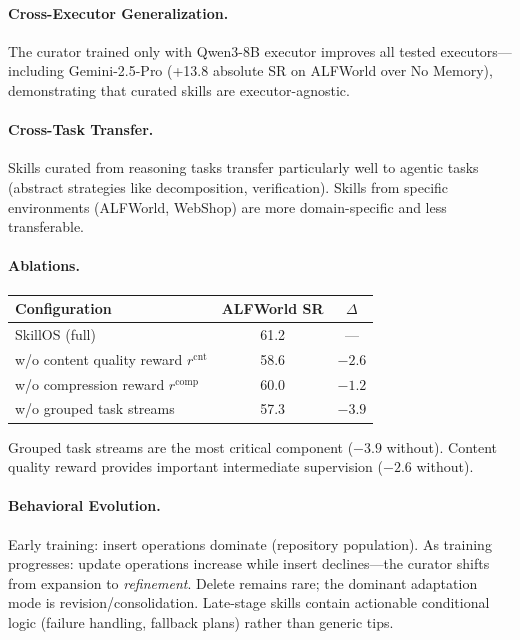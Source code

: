 \documentclass[11pt]{article}
\begin{document}
\paragraph{Cross-Executor Generalization.}
The curator trained only with Qwen3-8B executor improves all tested executors---including Gemini-2.5-Pro (+13.8 absolute SR on ALFWorld over No Memory), demonstrating that curated skills are executor-agnostic.

\paragraph{Cross-Task Transfer.}
Skills curated from reasoning tasks transfer particularly well to agentic tasks (abstract strategies like decomposition, verification). Skills from specific environments (ALFWorld, WebShop) are more domain-specific and less transferable.

\paragraph{Ablations.}
\begin{center}
\begin{tabular}{lcc}
\toprule
\textbf{Configuration} & \textbf{ALFWorld SR} & \textbf{$\Delta$} \\
\midrule
SkillOS (full) & 61.2 & --- \\
w/o content quality reward $r^{\mathrm{cnt}}$ & 58.6 & $-2.6$ \\
w/o compression reward $r^{\mathrm{comp}}$ & 60.0 & $-1.2$ \\
w/o grouped task streams & 57.3 & $-3.9$ \\
\bottomrule
\end{tabular}
\end{center}

Grouped task streams are the most critical component ($-3.9$ without). Content quality reward provides important intermediate supervision ($-2.6$ without).

\paragraph{Behavioral Evolution.}
Early training: insert operations dominate (repository population). As training progresses: update operations increase while insert declines---the curator shifts from expansion to \emph{refinement}. Delete remains rare; the dominant adaptation mode is revision/consolidation. Late-stage skills contain actionable conditional logic (failure handling, fallback plans) rather than generic tips.
\end{document}
